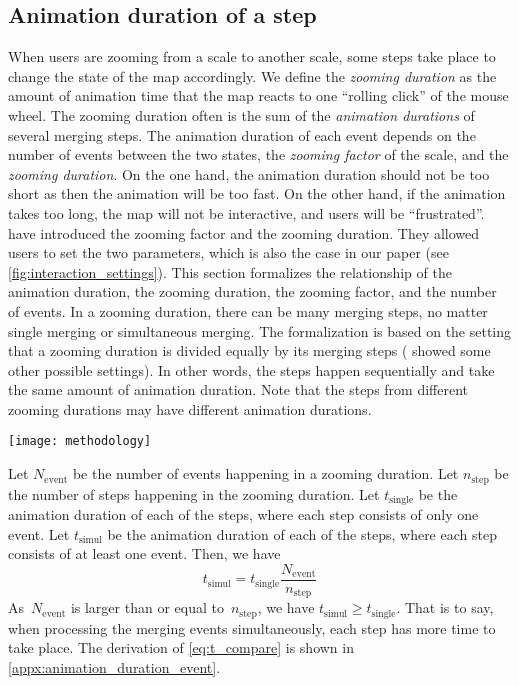 \documentclass[twocolumn]{svjour3}          %
\begin{document}
\subsection{Animation duration of a step}
\label{sec:zooming_duration}

When users are zooming from a scale to another scale,
some steps take place to change the state of the map accordingly.
We define the \emph{zooming duration} as the amount of 
animation time that the map reacts to one ``rolling click'' of the mouse wheel.
The zooming duration often is the sum of 
the \emph{animation durations} of several merging steps.
The animation duration of each event depends on 
the number of events between the two states,
the \emph{zooming factor} of the scale, and 
the \emph{zooming duration}.
On the one hand, the animation duration should not be too short 
as then the animation will be too fast. 
On the other hand, if the animation takes too long, 
the map will not be interactive, and users will be ``frustrated''.
\citet[][]{Meijers2020Web} 
have introduced the zooming factor and the zooming duration.
They allowed users to set the two parameters,
which is also the case in our paper
(see \fig\ref{fig:interaction_settings}).
This section formalizes the relationship of the animation duration,
the zooming duration, the zooming factor, and the number of events.
In a zooming duration, there can be many merging steps,
no matter single merging or simultaneous merging.
The formalization is based on the setting that
a zooming duration is divided equally by its merging steps
(\citet[][]{Suba2017Thesis} showed some other possible settings).
In other words,
the steps happen sequentially and take the same amount of animation duration.
Note that the steps from different zooming durations 
may have different animation durations.

\begin{figure*}[tb]
\centering
\texttt{[image: methodology]}
\caption{Our panel of settings. 
Among others, one can set how much to zoom when scrolling the mouse wheel 
and set the zooming duration. 
}
\label{fig:interaction_settings}
\end{figure*}

Let $N_\mathrm{event}$ be the number of events happening in a zooming duration.
Let $n_\mathrm{step}$ be the number of steps happening in the zooming duration.
Let $t_\mathrm{single}$ be the animation duration of each of the steps,
where each step consists of only one event.
Let $t_\mathrm{simul}$ be the animation duration of each of the steps,
where each step consists of at least one event.
Then, we have 
\begin{equation}
\label{eq:t_compare}
t_\mathrm{simul} = t_\mathrm{single}  \frac{N_\mathrm{event}}{n_\mathrm{step}}
\end{equation}
As~$N_\mathrm{event}$ is larger than or equal to~$n_\mathrm{step}$,
we have $t_\mathrm{simul} \ge t_\mathrm{single}$.
That is to say, when processing the merging events simultaneously,
each step has more time to take place. 
The derivation of \eq\ref{eq:t_compare} is shown 
in \appx\ref{appx:animation_duration_event}.
\end{document}

